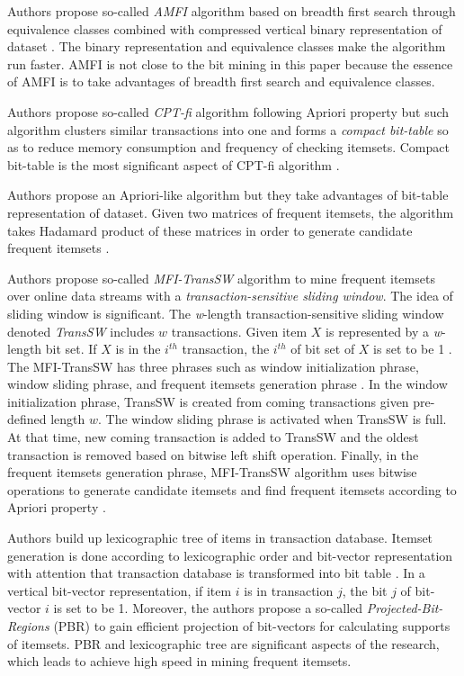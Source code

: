 \documentclass[10pt]{article}
\begin{document}
Authors \cite{leon:compression} propose so-called \textit{AMFI} algorithm based on breadth first search through equivalence classes combined with compressed vertical binary representation of dataset \cite[p.~486]{leon:compression}. The binary representation and equivalence classes make the algorithm run faster. AMFI is not close to the bit mining in this paper because the essence of AMFI is to take advantages of breadth first search and equivalence classes.

Authors \cite{raja:bittablefi} propose so-called \textit{CPT-fi} algorithm following Apriori property but such algorithm clusters similar transactions into one and forms a \textit{compact bit-table} so as to reduce memory consumption and frequency of checking itemsets. Compact bit-table is the most significant aspect of CPT-fi algorithm \cite[p.~74]{raja:bittablefi}.

Authors \cite{kiraly:bittable} propose an Apriori-like algorithm but they take advantages of bit-table representation of dataset. Given two matrices of frequent itemsets, the algorithm takes Hadamard product of these matrices in order to generate candidate frequent itemsets \cite[p.~4]{kiraly:bittable}.

Authors \cite{li:slidingwindow} propose so-called \textit{MFI-TransSW} algorithm to mine frequent itemsets over online data streams with a \textit{transaction-sensitive sliding window}. The idea of sliding window is significant. The \textit{w}-length transaction-sensitive sliding window denoted \textit{TransSW} includes $w$ transactions. Given item $X$ is represented by a \textit{w}-length bit set. If $X$ is in the $i^{th}$ transaction, the $i^{th}$ of bit set of $X$ is set to be 1 \cite[p.~2674]{li:slidingwindow}. The MFI-TransSW has three phrases such as window initialization phrase, window sliding phrase, and frequent itemsets generation phrase \cite[p.~2674]{li:slidingwindow}. In the window initialization phrase, TransSW is created from coming transactions given pre-defined length $w$. The window sliding phrase is activated when TransSW is full. At that time, new coming transaction is added to TransSW and the oldest transaction is removed based on bitwise left shift operation. Finally, in the frequent itemsets generation phrase, MFI-TransSW algorithm uses bitwise operations to generate candidate itemsets and find frequent itemsets according to Apriori property \cite[p.~2675]{li:slidingwindow}.

Authors \cite{bashir:fast} build up lexicographic tree of items in transaction database. Itemset generation is done according to lexicographic order and bit-vector representation with attention that transaction database is transformed into bit table \cite[p.~8]{bashir:fast}. In a vertical bit-vector representation, if item $i$ is in transaction $j$, the bit $j$ of bit-vector $i$ is set to be 1. Moreover, the authors \cite[pp.~9-10]{bashir:fast} propose a so-called \textit{Projected-Bit-Regions} (PBR) to gain efficient projection of bit-vectors for calculating supports of itemsets. PBR and lexicographic tree are significant aspects of the research, which leads to achieve high speed in mining frequent itemsets.
\end{document}
